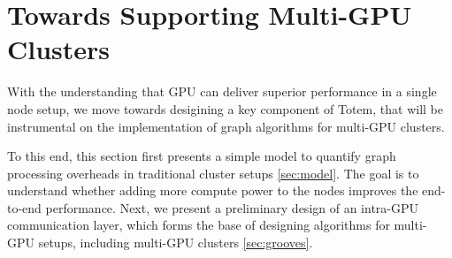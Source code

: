 \documentclass{acm_proc_article-sp}[12pt]
\begin{document}



\section{Towards Supporting Multi-GPU Clusters}
\label{sec:cluster}
With the understanding that GPU can deliver superior performance in a single node setup, we move towards desigining a key component of {\sc Totem}, that will be instrumental on the implementation of graph algorithms for multi-GPU clusters. 

To this end, this section first presents a simple model to quantify graph processing overheads in traditional cluster setups \ref{sec:model}. The goal is to understand whether adding more compute power to the nodes improves the end-to-end performance. Next, we present a preliminary design of an intra-GPU communication layer, which forms the base of designing algorithms for multi-GPU setups, including multi-GPU clusters \ref{sec:grooves}.








\end{document}
